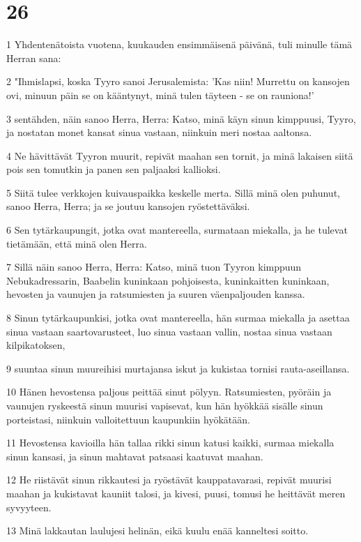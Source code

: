 \chapter{26}

\par 1 Yhdentenätoista vuotena, kuukauden ensimmäisenä päivänä, tuli minulle tämä Herran sana:
\par 2 "Ihmislapsi, koska Tyyro sanoi Jerusalemista: 'Kas niin! Murrettu on kansojen ovi, minuun päin se on kääntynyt, minä tulen täyteen - se on rauniona!'
\par 3 sentähden, näin sanoo Herra, Herra: Katso, minä käyn sinun kimppuusi, Tyyro, ja nostatan monet kansat sinua vastaan, niinkuin meri nostaa aaltonsa.
\par 4 Ne hävittävät Tyyron muurit, repivät maahan sen tornit, ja minä lakaisen siitä pois sen tomutkin ja panen sen paljaaksi kallioksi.
\par 5 Siitä tulee verkkojen kuivauspaikka keskelle merta. Sillä minä olen puhunut, sanoo Herra, Herra; ja se joutuu kansojen ryöstettäväksi.
\par 6 Sen tytärkaupungit, jotka ovat mantereella, surmataan miekalla, ja he tulevat tietämään, että minä olen Herra.
\par 7 Sillä näin sanoo Herra, Herra: Katso, minä tuon Tyyron kimppuun Nebukadressarin, Baabelin kuninkaan pohjoisesta, kuninkaitten kuninkaan, hevosten ja vaunujen ja ratsumiesten ja suuren väenpaljouden kanssa.
\par 8 Sinun tytärkaupunkisi, jotka ovat mantereella, hän surmaa miekalla ja asettaa sinua vastaan saartovarusteet, luo sinua vastaan vallin, nostaa sinua vastaan kilpikatoksen,
\par 9 suuntaa sinun muureihisi murtajansa iskut ja kukistaa tornisi rauta-aseillansa.
\par 10 Hänen hevostensa paljous peittää sinut pölyyn. Ratsumiesten, pyöräin ja vaunujen ryskeestä sinun muurisi vapisevat, kun hän hyökkää sisälle sinun porteistasi, niinkuin valloitettuun kaupunkiin hyökätään.
\par 11 Hevostensa kavioilla hän tallaa rikki sinun katusi kaikki, surmaa miekalla sinun kansasi, ja sinun mahtavat patsaasi kaatuvat maahan.
\par 12 He riistävät sinun rikkautesi ja ryöstävät kauppatavarasi, repivät muurisi maahan ja kukistavat kauniit talosi, ja kivesi, puusi, tomusi he heittävät meren syvyyteen.
\par 13 Minä lakkautan laulujesi helinän, eikä kuulu enää kanneltesi soitto.

